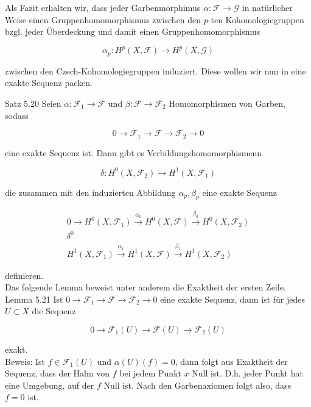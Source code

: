 \documentclass[10pt, letterpaper]{article}
\begin{document}
Als Fazit erhalten wir, dass jeder Garbenmorphimus $\alpha: \mathcal{F} \rightarrow \mathcal{G}$ in natürlicher Weise einen Gruppenhomomorphismus zwischen den $p$-ten Kohomologiegruppen bzgl. jeder Überdeckung und damit einen Gruppenhomomorphismus

$$
\alpha_{p}: H^{p}(X, \mathcal{F}) \rightarrow H^{p}(X, \mathcal{G})
$$

zwischen den Czech-Kohomologiegruppen induziert. Diese wollen wir nun in eine exakte Sequenz packen.

Satz 5.20 Seien $\alpha: \mathcal{F}_{1} \rightarrow \mathcal{F}$ und $\beta: \mathcal{F} \rightarrow \mathcal{F}_{2}$ Homomorphismen von Garben, sodass

$$
0 \rightarrow \mathcal{F}_{1} \rightarrow \mathcal{F} \rightarrow \mathcal{F}_{2} \rightarrow 0
$$

eine exakte Sequenz ist. Dann gibt es Verbildungshomomorphismenn

$$
\delta: H^{0}\left(X, \mathcal{F}_{2}\right) \rightarrow H^{1}\left(X, \mathcal{F}_{1}\right)
$$

die zusammen mit den induzierten Abbildung $\alpha_{p}, \beta_{p}$ eine exakte Sequenz

$$
\begin{aligned}
0 \longrightarrow H^{0}\left(X, \mathcal{F}_{1}\right) \xrightarrow{\alpha_{0}} H^{0}(X, \mathcal{F}) \xrightarrow{\beta_{0}} H^{0}\left(X, \mathcal{F}_{2}\right) \\
\delta^{0} \\
H^{1}\left(X, \mathcal{F}_{1}\right) \xrightarrow{\alpha_{1}} H^{1}(X, \mathcal{F}) \xrightarrow{\beta_{1}} H^{1}\left(X, \mathcal{F}_{2}\right)
\end{aligned}
$$

definieren.\\
Das folgende Lemma beweist unter anderem die Exaktheit der ersten Zeile.\\
Lemma 5.21 Ist $0 \rightarrow \mathcal{F}_{1} \rightarrow \mathcal{F} \rightarrow \mathcal{F}_{2} \rightarrow 0$ eine exakte Sequenz, dann ist für jedes $U \subset X$ die Sequenz

$$
0 \rightarrow \mathcal{F}_{1}(U) \rightarrow \mathcal{F}(U) \rightarrow \mathcal{F}_{2}(U)
$$

exakt.\\
Beweis: Ist $f \in \mathcal{F}_{1}(U)$ und $\alpha(U)(f)=0$, dann folgt aus Exaktheit der Sequenz, dass der Halm von $f$ bei jedem Punkt $x$ Null ist. D.h. jeder Punkt hat eine Umgebung, auf der $f$ Null ist. Nach den Garbenaxiomen folgt also, dass $f=0$ ist.
\end{document}
